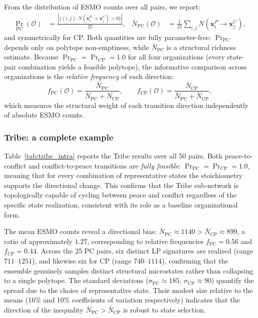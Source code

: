 From the distribution of ESMO counts over all pairs, we report:
\begin{align*}
  \Pr_{\text{PC}}(\mathcal{O}) &= \frac{|\{(i,j): N(\mathbf{x}^P_i \to \mathbf{x}^C_j) > 0\}|}{25}, &
  \bar{N}_{\text{PC}}(\mathcal{O}) &= \frac{1}{25}\sum_{i,j} N(\mathbf{x}^P_i \to \mathbf{x}^C_j),
\end{align*}
and symmetrically for CP.  Both quantities are fully parameter-free:
$\Pr_{\text{PC}}$ depends only on polytope non-emptiness,
while $\bar{N}_{\text{PC}}$ is a structural richness estimate.
Because $\Pr_{\text{PC}} = \Pr_{\text{CP}} = 1.0$ for all four organizations
(every state-pair combination yields a feasible polytope), the informative
comparison across organizations is the \emph{relative frequency} of each
direction:
\begin{equation}
  f_{\text{PC}}(\mathcal{O}) = \frac{\bar{N}_{\text{PC}}}{\bar{N}_{\text{PC}} + \bar{N}_{\text{CP}}},
  \qquad
  f_{\text{CP}}(\mathcal{O}) = \frac{\bar{N}_{\text{CP}}}{\bar{N}_{\text{PC}} + \bar{N}_{\text{CP}}},
  \label{eq:rel_freq}
\end{equation}
which measures the structural weight of each transition direction independently
of absolute ESMO counts.

\subsubsection*{Tribe: a complete example}

Table~\ref{tab:tribe_intra} reports the Tribe results over all 50 pairs.
Both peace-to-conflict and conflict-to-peace transitions are \emph{fully
feasible}: $\Pr_{\text{PC}} = \Pr_{\text{CP}} = 1.0$, meaning that for
every combination of representative states the stoichiometry supports
the directional change.  This confirms that the Tribe sub-network is
topologically capable of cycling between peace and conflict regardless of
the specific state realization, consistent with its role as a baseline
organizational form.

The mean ESMO counts reveal a directional bias:
$\bar{N}_{\text{PC}} \approx 1140 > \bar{N}_{\text{CP}} \approx 899$,
a ratio of approximately $1.27$, corresponding to relative frequencies
$f_{\text{PC}} = 0.56$ and $f_{\text{CP}} = 0.44$.
Across the 25 PC pairs, six distinct LP signatures are realized
(range $711$--$1251$), and likewise six for CP (range $740$--$1114$),
confirming that the ensemble genuinely samples distinct structural
microstates rather than collapsing to a single polytope.
The standard deviations ($\sigma_{\text{PC}} \approx 185$,
$\sigma_{\text{CP}} \approx 90$) quantify the spread due to the choice of
representative state.  Their modest size relative to the means (16\% and
10\% coefficients of variation respectively) indicates that the direction of
the inequality $\bar{N}_{\text{PC}} > \bar{N}_{\text{CP}}$ is robust to
state selection.

